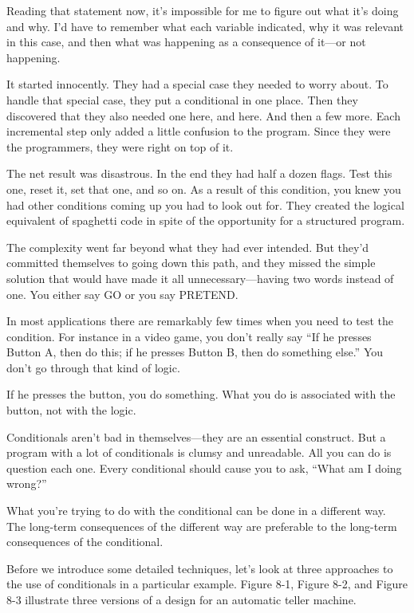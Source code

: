 Reading that statement now, it's impossible for me to figure out what it's
doing and why. I'd have to remember what each variable indicated, why it
was relevant in this case, and then what was happening as a consequence of
it---or not happening.

It started innocently. They had a special case they needed to worry about.
To handle that special case, they put a conditional in one place. Then they
discovered that they also needed one here, and here. And then a few more.
Each incremental step only added a little confusion to the program. Since
they were the programmers, they were right on top of it.

The net result was disastrous. In the end they had half a dozen flags. Test
this one, reset it, set that one, and so on. As a result of this condition, you
knew you had other conditions coming up you had to look out for. They
created the logical equivalent of spaghetti code in spite of the opportunity
for a structured program.

The complexity went far beyond what they had ever intended. But they'd
committed themselves to going down this path, and they missed the simple
solution that would have made it all unnecessary---having two words
instead of one. You either say GO or you say PRETEND.

In most applications there are remarkably few times when you need to test
the condition. For instance in a video game, you don't really say ``If he
presses Button A, then do this; if he presses Button B, then do something
else.'' You don't go through that kind of logic.

If he presses the button, you do something. What you do is associated with
the button, not with the logic.

Conditionals aren't bad in themselves---they are an essential construct. But
a program with a lot of conditionals is clumsy and unreadable. All you can
do is question each one. Every conditional should cause you to ask, ``What
am I doing wrong?''

What you're trying to do with the conditional can be done in a different
way. The long-term consequences of the different way are preferable to the
long-term consequences of the conditional.

Before we introduce some detailed techniques, let's look at three approaches
to the use of conditionals in a particular example. Figure 8-1,
Figure 8-2, and Figure 8-3 illustrate three versions of a design for an
automatic teller machine.

